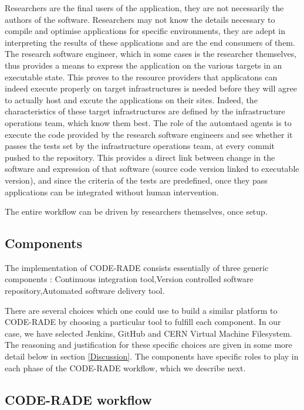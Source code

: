 \documentclass[a4paper]{jpconf}
\begin{document}
    Researchers are the final users of the application, they are not necessarily the authors of
    the software. Researchers may not know the details necessary to compile and optimise
    applications for specific environments, they are adept in interpreting the results of
    these applications and are the end consumers of them. The research software engineer, which in
    some cases is the researcher themselves, thus provides a means to express the application on the
    various targets in an executable state. This proves to the resource providers that
    applicatons can indeed execute properly on target infrastructures is needed before they will
    agree to actually host and excute the applications on their sites. Indeed, the characteristics
    of these target infrastructures are defined by the infrastructure operations team, which know
    them best. The role of the automtaed agents is to execute the code provided by the research
    software engineers and see whether it passes the tests set by the infrastructure operations
    team, at every commit pushed to the repository. This provides a direct link between change in
    the software and expression of that software (source code version linked to executable version),
    and since the criteria of the tests are predefined, once they pass applications can be integrated
    without human intervention.

	The entire workflow can be driven by researchers themselves, once setup.

	\subsection{Components}

	The implementation of CODE-RADE consists essentially of three generic components : Continuous 
    integration tool,Version controlled software repository,Automated software delivery tool.

    There are several choices  which one could use to build a similar platform to CODE-RADE by
    choosing a particular tool to fulfill each component. In our case, we have selected
    Jenkins\cite{Jenkins}, GitHub\cite{Github} and CERN Virtual Machine Filesystem\cite{CVMFS}. The
    reasoning and justification for these specific choices are given in some more detail below in
    section \ref{Discussion}. The components have specific roles to play in each phase of the
    CODE-RADE workflow, which we describe next.

	\subsection{CODE-RADE workflow}
\end{document}
